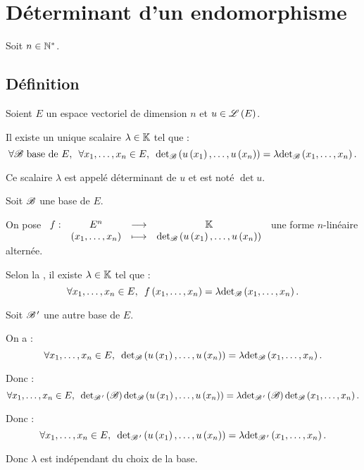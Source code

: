 \section{Déterminant d'un endomorphisme}

Soit \(n\in\mathbb{N}^*\).

\subsection{Définition}

\begin{deftheo}
Soient \(E\) un espace vectoriel de dimension \(n\) et \(u\in\mathscr{L}\left(E\right)\).

Il existe un unique scalaire \(\lambda\in\mathbb{K}\) tel que : \[\quantifs{\forall\fami{B}\text{ base de }E;\forall x_1,\dots,x_n\in E}\detb\paren{u\paren{x_1},\dots,u\paren{x_n}}=\lambda\detb\paren{x_1,\dots,x_n}.\]

Ce scalaire \(\lambda\) est appelé déterminant de \(u\) et est noté \(\det u\).
\end{deftheo}

\begin{dem}
Soit \(\mathscr{B}\) une base de \(E\).

On pose \(\fonction{f}{E^n}{\K}{\paren{x_1,\dots,x_n}}{\detb\paren{u\paren{x_1},\dots,u\paren{x_n}}}\) une forme \(n\)-linéaire alternée.

Selon la , il existe \(\lambda\in\mathbb{K}\) tel que : \[\quantifs{\forall x_1,\dots,x_n\in E}f\paren{x_1,\dots,x_n}=\lambda\detb\paren{x_1,\dots,x_n}.\]

Soit \(\mathscr{B}^{\,\prime}\) une autre base de \(E\).

On a : \[\quantifs{\forall x_1,\dots,x_n\in E}\detb\paren{u\paren{x_1},\dots,u\paren{x_n}}=\lambda\detb\paren{x_1,\dots,x_n}.\]

Donc : \[\quantifs{\forall x_1,\dots,x_n\in E}\detb[\fami{B}\prim]\paren{\fami{B}}\detb\paren{u\paren{x_1},\dots,u\paren{x_n}}=\lambda\detb[\fami{B}\prim]\paren{\fami{B}}\detb\paren{x_1,\dots,x_n}.\]

Donc : \[\quantifs{\forall x_1,\dots,x_n\in E}\detb[\fami{B}\prim]\paren{u\paren{x_1},\dots,u\paren{x_n}}=\lambda\detb[\fami{B}\prim]\paren{x_1,\dots,x_n}.\]

Donc \(\lambda\) est indépendant du choix de la base.
\end{dem}

